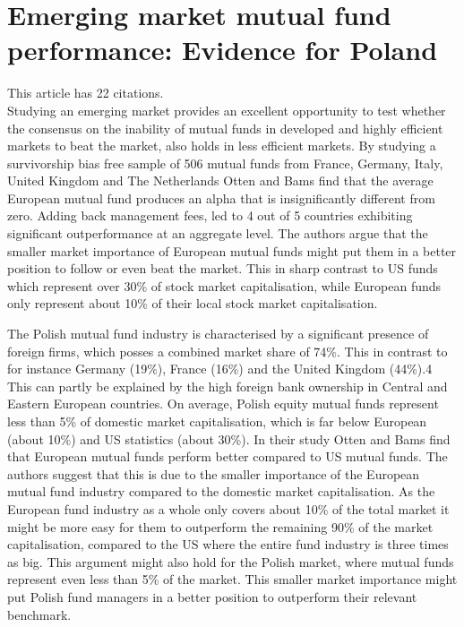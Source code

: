 \documentclass[12 pt]{article}
\begin{document}
\section{Emerging market mutual fund performance: Evidence for Poland}
This article has 22 citations. \\
Studying an emerging market provides an excellent opportunity to test whether the consensus on the inability of mutual funds in developed and highly efficient markets to beat the market, also holds in less efficient markets.  By studying a survivorship bias free sample of 506 mutual funds from France, Germany, Italy, United Kingdom and The Netherlands Otten and Bams find that the average European mutual fund produces an alpha that is insignificantly different from zero. Adding back management fees, led to 4 out of 5 countries exhibiting significant outperformance at an aggregate level. The authors argue that the smaller market importance of European mutual funds might put them in a better position to follow or even beat the market. This in sharp contrast to US funds which represent over 30\% of stock market capitalisation, while European funds only represent about 10\% of their local stock market capitalisation.
\par The Polish mutual fund industry is characterised by a significant presence of foreign firms, which posses a combined market share of 74\%. This in contrast to for instance Germany (19\%), France (16\%) and the United Kingdom (44\%).4 This can partly be explained by the high foreign bank ownership in Central and Eastern European countries. On average, Polish equity mutual funds represent less than 5\% of domestic market capitalisation, which is far below European (about 10\%) and US statistics (about 30\%). In their study Otten and Bams find that European mutual funds perform better compared to US mutual funds. The authors suggest that this is due to the smaller importance of the European mutual fund industry compared to the domestic market capitalisation. As the European fund industry as a whole only covers about 10\% of the total market it might be more easy for them to outperform the remaining 90\% of the market capitalisation, compared to the US where the entire fund industry is three times as big. This argument might also hold for the Polish market, where mutual funds represent even less than 5\% of the market. This smaller market importance might put Polish fund managers in a better position to outperform their relevant benchmark.
\end{document}
